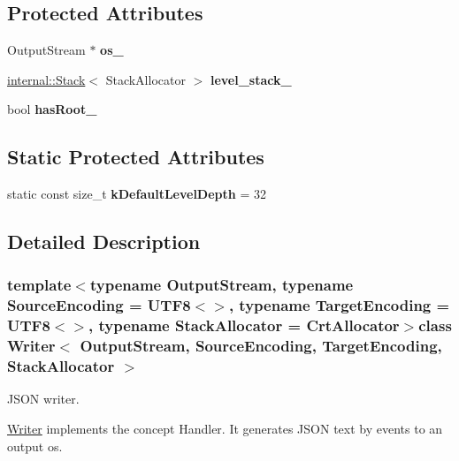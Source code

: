 \subsection*{Protected Attributes}
\begin{DoxyCompactItemize}
\item 
\hypertarget{class_writer_a51ba99f008df7bbf32de311aa22b05ae}{}Output\+Stream $\ast$ {\bfseries os\+\_\+}\label{class_writer_a51ba99f008df7bbf32de311aa22b05ae}

\item 
\hypertarget{class_writer_af179a9f272f80414d48f64ede9ddde12}{}\hyperlink{classinternal_1_1_stack}{internal\+::\+Stack}$<$ Stack\+Allocator $>$ {\bfseries level\+\_\+stack\+\_\+}\label{class_writer_af179a9f272f80414d48f64ede9ddde12}

\item 
\hypertarget{class_writer_af252ff409093ea786d5efce0d08d3804}{}bool {\bfseries has\+Root\+\_\+}\label{class_writer_af252ff409093ea786d5efce0d08d3804}

\end{DoxyCompactItemize}
\subsection*{Static Protected Attributes}
\begin{DoxyCompactItemize}
\item 
\hypertarget{class_writer_aad47efc97708b2a64e4a0994cbbfae25}{}static const size\+\_\+t {\bfseries k\+Default\+Level\+Depth} = 32\label{class_writer_aad47efc97708b2a64e4a0994cbbfae25}

\end{DoxyCompactItemize}


\subsection{Detailed Description}
\subsubsection*{template$<$typename Output\+Stream, typename Source\+Encoding = U\+T\+F8$<$$>$, typename Target\+Encoding = U\+T\+F8$<$$>$, typename Stack\+Allocator = Crt\+Allocator$>$class Writer$<$ Output\+Stream, Source\+Encoding, Target\+Encoding, Stack\+Allocator $>$}

J\+S\+O\+N writer. 

\hyperlink{class_writer}{Writer} implements the concept Handler. It generates J\+S\+O\+N text by events to an output os.

